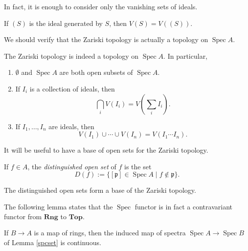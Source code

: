 \documentclass[11pt,openany]{book} %
\newcommand{\spc}{\operatorname{Spec}}
\begin{document}
In fact, it is enough to consider only the vanishing sets of ideals.\\

\begin{lemma}
If $(S)$ is the ideal generated by $S$, then $V(S) = V((S))$.
\end{lemma}
\medskip

We should verify that the Zariski topology is actually a topology on $\spc A$.\\

\begin{proposition}
The Zariski topology is indeed a topology on $\spc A$. In particular,
\begin{enumerate}
	\item $\emptyset$ and $\spc A$ are both open subsets of $\spc A$.
    \item If $I_i$ is a collection of ideals, then $$\bigcap_i V(I_i) = V\left(\sum_i I_i\right).$$ 
    \item If $I_1,\ldots,I_n$ are ideals, then $$V(I_1) \cup \cdots \cup V(I_n) = V(I_1\cdots I_n).$$
\end{enumerate}
\end{proposition}
\hfill

It will be useful to have a base of open sets for the Zariski topology.\\

\begin{definition}
If $f \in A$, the \emph{distinguished open set} of $f$ is the set
\[
	D(f) := \{[\mathfrak{p}] \in \spc A \mid f \not\in \mathfrak{p}\}.
\]
\end{definition}
\hfill

\begin{proposition}
The distinguished open sets form a base of the Zariski topology.
\end{proposition}
\hfill

The following lemma states that the $\spc$ functor is in fact a contravariant functor from $\mathbf{Rng}$ to $\mathbf{Top}$.\\

\begin{lemma} \label{spctop}
If $B \to A$ is a map of rings, then the induced map of spectra $\spc A \to \spc B$ of Lemma \ref{spcset} is continuous.
\end{lemma}

\end{document}

